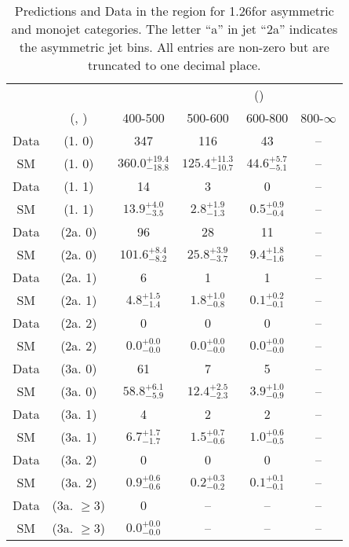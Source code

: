\begin{table}[h!]
\tiny
\centering
\caption{Predictions and Data in the \gj region for 1.26\ifb for asymmetric and monojet categories. The letter ``a'' in jet \eg ``2a''  indicates the asymmetric jet bins. All entries are non-zero but are truncated to one decimal place.\label{tab:predall_comb_gj_asym}}
\begin{tabular}
{cccccc}
	\hline\hline
&	&	& \multicolumn{4}{c}{\scalht (\gev)}\\ 
	&	 (\njet, \nb) & 400-500 & 500-600 & 600-800 & 800-$\infty$ \\ [0.8ex] 
\hline
	Data & (1. 0) & 347 & 116 & 43 & -- \\[0.5ex] 
	SM & (1. 0) & $360.0^{+ 19.4 }_{- 18.8 }$ & $125.4^{+ 11.3 }_{- 10.7 }$ & $44.6^{+ 5.7 }_{- 5.1 }$ & -- \\[0.5ex] 
	Data & (1. 1) & 14 & 3 & 0 & -- \\[0.5ex] 
	SM & (1. 1) & $13.9^{+ 4.0 }_{- 3.5 }$ & $2.8^{+ 1.9 }_{- 1.3 }$ & $0.5^{+ 0.9 }_{- 0.4 }$ & -- \\[0.5ex] 
	Data & (2a. 0) & 96 & 28 & 11 & -- \\[0.5ex] 
	SM & (2a. 0) & $101.6^{+ 8.4 }_{- 8.2 }$ & $25.8^{+ 3.9 }_{- 3.7 }$ & $9.4^{+ 1.8 }_{- 1.6 }$ & -- \\[0.5ex] 
	Data & (2a. 1) & 6 & 1 & 1 & -- \\[0.5ex] 
	SM & (2a. 1) & $4.8^{+ 1.5 }_{- 1.4 }$ & $1.8^{+ 1.0 }_{- 0.8 }$ & $0.1^{+ 0.2 }_{- 0.1 }$ & -- \\[0.5ex] 
	Data & (2a. 2) & 0 & 0 & 0 & -- \\[0.5ex] 
	SM & (2a. 2) & $0.0^{+ 0.0 }_{- 0.0 }$ & $0.0^{+ 0.0 }_{- 0.0 }$ & $0.0^{+ 0.0 }_{- 0.0 }$ & -- \\[0.5ex] 
	Data & (3a. 0) & 61 & 7 & 5 & -- \\[0.5ex] 
	SM & (3a. 0) & $58.8^{+ 6.1 }_{- 5.9 }$ & $12.4^{+ 2.5 }_{- 2.3 }$ & $3.9^{+ 1.0 }_{- 0.9 }$ & -- \\[0.5ex] 
	Data & (3a. 1) & 4 & 2 & 2 & -- \\[0.5ex] 
	SM & (3a. 1) & $6.7^{+ 1.7 }_{- 1.7 }$ & $1.5^{+ 0.7 }_{- 0.6 }$ & $1.0^{+ 0.6 }_{- 0.5 }$ & -- \\[0.5ex] 
	Data & (3a. 2) & 0 & 0 & 0 & -- \\[0.5ex] 
	SM & (3a. 2) & $0.9^{+ 0.6 }_{- 0.6 }$ & $0.2^{+ 0.3 }_{- 0.2 }$ & $0.1^{+ 0.1 }_{- 0.1 }$ & -- \\[0.5ex] 
	Data & (3a. $\ge3$) & 0 & -- & -- & -- \\[0.5ex] 
	SM & (3a. $\ge3$) & $0.0^{+ 0.0 }_{- 0.0 }$ & -- & -- & -- \\[0.5ex] 

\end{tabular}
\end{table}
